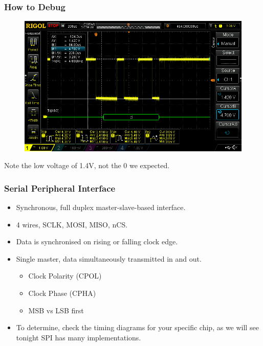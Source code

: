 \documentclass[t]{beamer}
\begin{document}

\begin{frame}[t]
\frametitle{How to Debug}
\begin{figure}
\includegraphics[width=0.9\linewidth]{badSerial.png}
\end{figure}
Note the low voltage of 1.4V, not the 0 we expected. 
\end{frame}


\begin{frame}[t]
\frametitle{Serial Peripheral Interface}
\begin{itemize}
	\item Synchronous, full duplex master-slave-based interface.
	\item 4 wires, SCLK, MOSI, MISO, nCS.
	\item Data is synchronised on rising or falling clock edge.
	\item Single master, data simultaneously transmitted in and out.
	\begin{itemize}
		\item Clock Polarity (CPOL)
		\item Clock Phase (CPHA)
		\item MSB vs LSB first
	\end{itemize}
	\item To determine, check the timing diagrams for your specific chip, as we will see tonight SPI has many implementations.
\end{itemize}

\end{frame}

\end{document}
